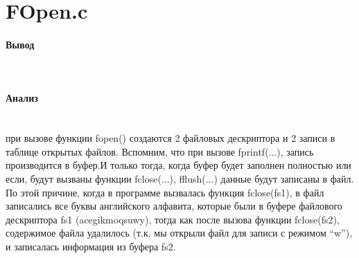 \section{FOpen.c}


\paragraph{Вывод}\hfill\\



\paragraph{Анализ}\hfill\\

при вызове функции fopen() создаются 2 файловых дескриптора и 2 записи в таблице открытых файлов. Вспомним, что при вызове fprintf(...), запись производится в буфер.И только тогда, когда буфер будет заполнен полностью или если, будут вызваны функции fclose(...), fflush(...) данные будут записаны в файл. По этой причине, когда в программе вызвалась функция fclose(fs1), в файл записались все буквы английского алфавита, которые были в буфере файлового дескриптора fs1 (acegikmoqsuwy), тогда как после вызова функции fclose(fs2), содержимое файла удалилось (т.к. мы открыли файл для записи с режимом “w”), и записалась информация из буфера fs2.